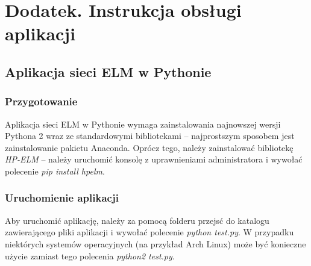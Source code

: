\documentclass{article}
\begin{document}
\clearpage
{}
\listoffigures
\clearpage
{}
\listoftables
\clearpage
\section*{Dodatek. Instrukcja obsługi aplikacji}
\subsection*{Aplikacja sieci ELM w Pythonie}
\subsubsection*{Przygotowanie}
Aplikacja sieci ELM w Pythonie wymaga zainstalowania najnowszej wersji Pythona 2 wraz ze standardowymi bibliotekami -- najprostszym sposobem jest zainstalowanie pakietu Anaconda. Oprócz tego, należy zainstalować bibliotekę \textit{HP-ELM} -- należy uruchomić konsolę z uprawnieniami administratora i wywołać polecenie \textit{pip install hpelm}. 
\subsubsection*{Uruchomienie aplikacji}
Aby uruchomić aplikację, należy za pomocą folderu przejsć do katalogu zawierającego pliki aplikacji i wywołać polecenie \textit{python test.py}. W przypadku niektórych systemów operacyjnych (na przykład Arch Linux) może być konieczne użycie zamiast tego polecenia \textit{python2 test.py}.
\end{document}
